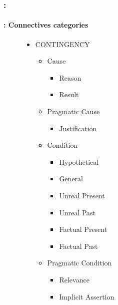 \documentclass[xcolor=table]{beamer}
\begin{document}
\begin{frame}
	\frametitle{\insertshortsubtitle: \insertsection}
	\framesubtitle{\insertsubsection: Connectives categories}
	
	\begin{figure}
		\centering\vspace{-12pt}
		\begin{tcolorbox}[colback=white, colframe=blue, boxrule=1pt, text width=.9\textwidth]
		\begin{minipage}{.3\textwidth}
			\tiny\bfseries\vspace{-6pt}
			\begin{itemize}
				\item CONTINGENCY
				\begin{itemize}\tiny\bfseries
					\item Cause
					\begin{itemize}\tiny\bfseries
						\item Reason
						\item Result
					\end{itemize}
					\item Pragmatic Cause
					\begin{itemize}\tiny\bfseries
						\item Justification
					\end{itemize}
					\item Condition
					\begin{itemize}\tiny\bfseries
						\item Hypothetical
						\item General
						\item Unreal Present
						\item Unreal Past
						\item Factual Present
						\item Factual Past
					\end{itemize}
					\item Pragmatic Condition
					\begin{itemize}\tiny\bfseries
						\item Relevance
						\item Implicit Assertion
					\end{itemize}
				\end{itemize}
			\end{itemize}
		\end{minipage}
		\begin{minipage}{.3\textwidth}
			\tiny\bfseries
			\begin{itemize}\tiny\bfseries

\end{itemize}
\end{minipage}
\end{tcolorbox}
\end{figure}
\end{frame}
\end{document}
